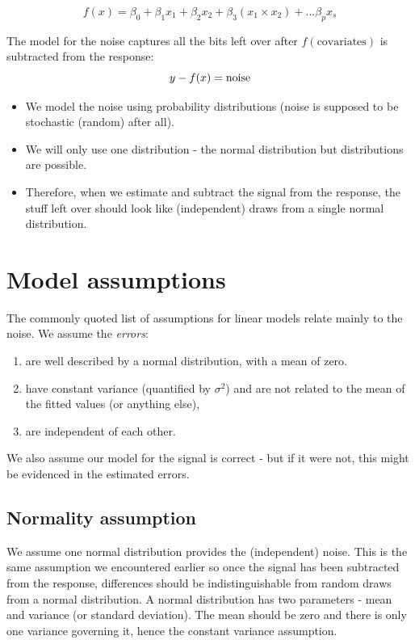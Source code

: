 \documentclass[
  oneside]{krantz}
\providecommand{\tightlist}{%
  \setlength{\itemsep}{0pt}\setlength{\parskip}{0pt}}
\begin{document}
\[f(x) = \beta_0 + \beta_1x_1 + \beta_2 x_2 + \beta_3(x_1 \times x_2) + ... \beta_p x_s\]

The model for the noise captures all the bits left over after \(f(\textrm{covariates})\) is subtracted from the response:
\[y - f(x) = {\rm noise}\]

\begin{itemize}
\tightlist
\item
  We model the noise using probability distributions (noise is supposed to be stochastic (random) after all).
\item
  We will only use one distribution - the normal distribution but distributions are possible.
\item
  Therefore, when we estimate and subtract the signal from the response, the stuff left over should look like (independent) draws from a single normal distribution.
\end{itemize}

\hypertarget{model-assumptions}{%
\section{Model assumptions}\label{model-assumptions}}

The commonly quoted list of assumptions for linear models relate mainly to the noise. We assume the \emph{errors}:

\begin{enumerate}
\def\labelenumi{\arabic{enumi}.}
\item
  are well described by a normal distribution, with a mean of zero.
\item
  have constant variance (quantified by \(\sigma^2\)) and are not related to the mean of the fitted values (or anything else),
\item
  are independent of each other.
\end{enumerate}

We also assume our model for the signal is correct - but if it were not, this might be evidenced in the estimated errors.

\hypertarget{normality-assumption}{%
\subsection{Normality assumption}\label{normality-assumption}}

We assume one normal distribution provides the (independent) noise. This is the same assumption we encountered earlier so once the signal has been subtracted from the response, differences should be indistinguishable from random draws from a normal distribution. A normal distribution has two parameters - mean and variance (or standard deviation). The mean should be zero and there is only one variance governing it, hence the constant variance assumption.
\end{document}
